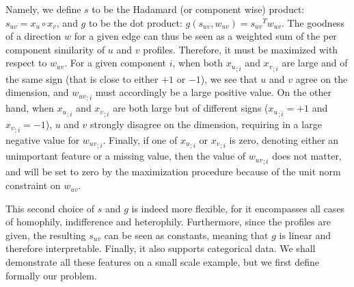 Namely, we define $s$ to be the Hadamard (or component wise) product: $s_{uv} = x_u \circ x_v$, and
$g$ to be the dot product: $g(s_{uv}, w_{uv}) = {s_{uv}}^T w_{uv}$. The goodness of a direction $w$
for a given edge can thus be seen as a weighted sum of the per component similarity of $u$ and $v$
profiles. Therefore, it must be maximized with respect to $w_{uv}$. For a given component $i$, when
both ${x_u}_{;i}$ and ${x_v}_{;i}$ are large and of the same sign (that is close to either $+1$ or
$-1$), we see that $u$ and $v$ agree on the \ith{} dimension, and ${w_{uv}}_{;i}$ must accordingly
be a large positive value. On the other hand, when ${x_u}_{;i}$ and ${x_v}_{;i}$ are both large but
of different signs (\eg ${x_u}_{;i} = +1$ and ${x_v}_{;i} = -1$), $u$ and $v$ strongly disagree on
the \ith{} dimension, requiring in a large negative value for ${w_{uv}}_{;i}$.  Finally, if one of
${x_u}_{;i}$ or ${x_v}_{;i}$ is zero, denoting either an unimportant feature or a missing value,
then the value of ${w_{uv}}_{;i}$ does not matter, and will be set to zero by the maximization
procedure because of the unit norm constraint on $w_{uv}$.

\iffalse
\begin{aside}
When $s$ is a distance, and therefore positive, we impose $w_{uv}\geq 0$. A link $(u,v)$ is then
well explained by $w_{uv}$ when observed differences along this direction are small. More precisely,
when the quantity ${s_{uv}}^T w_{uv}$ is close to zero. Because $w_{uv}$ is unit norm, the \ith{}
component of $w_{uv}$ should be large when the \ith{} feature of $x_u$ and $x_v$ are close. Hence, a
null value for a component $i$ of $s_{uv}$ should not mean anything else than $u$ and $v$ share a
known and similar feature $i$ (\eg{} the unknown value should be different from $0$). When $s$ is
the difference $x_u - x_v$, it can be negative and the same reasoning can be applied, but with
$w_{uv}\in [-1,1]^d$ and a link value of $\left({s_{uv}}^T w_{uv}\right)^2$.

An alternative is to consider that the combination is a similarity. Links are created when the
observed similarity is high. Again, if $s$ is positive, it seems reasonable to impose that
$w_{uv}\geq0$ (and if $s$ can be negative, then $w_{uv}$ should be in $[-1,1]$). One main advantage
of similarities is maybe to avoid (or minimize) problems with missing values setting them to 0.
\end{aside}
\fi

\medskip

This second choice of $s$ and $g$ is indeed more flexible, for it encompasses all cases of
homophily, indifference and heterophily. Furthermore, since the profiles are given, the resulting
$s_{uv}$ can be seen as constants, meaning that $g$ is linear and therefore interpretable. Finally,
it also supports categorical data. We shall demonstrate all these features on a small scale example,
but we first define formally our problem.

